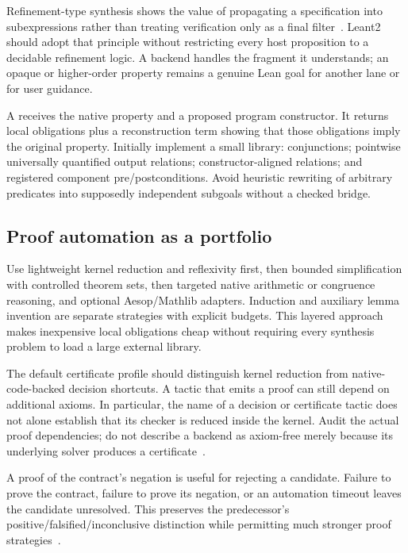 Refinement-type synthesis shows the value of propagating a specification into subexpressions rather than treating verification only as a final filter~\cite{synquid}. Leant2 should adopt that principle without restricting every host proposition to a decidable refinement logic. A backend handles the fragment it understands; an opaque or higher-order property remains a genuine Lean goal for another lane or for user guidance.

A  receives the native property and a proposed program constructor. It returns local obligations plus a reconstruction term showing that those obligations imply the original property. Initially implement a small library: conjunctions; pointwise universally quantified output relations; constructor-aligned relations; and registered component pre/postconditions. Avoid heuristic rewriting of arbitrary predicates into supposedly independent subgoals without a checked bridge.

\subsection{Proof automation as a portfolio}

Use lightweight kernel reduction and reflexivity first, then bounded simplification with controlled theorem sets, then targeted native arithmetic or congruence reasoning, and optional Aesop/Mathlib adapters. Induction and auxiliary lemma invention are separate strategies with explicit budgets. This layered approach makes inexpensive local obligations cheap without requiring every synthesis problem to load a large external library.

The default certificate profile should distinguish kernel reduction from native-code-backed decision shortcuts. A tactic that emits a proof can still depend on additional axioms. In particular, the name of a decision or certificate tactic does not alone establish that its checker is reduced inside the kernel. Audit the actual proof dependencies; do not describe a backend as axiom-free merely because its underlying solver produces a certificate~\cite{lean-axioms,lean-tactics}.

A proof of the contract's negation is useful for rejecting a candidate. Failure to prove the contract, failure to prove its negation, or an automation timeout leaves the candidate unresolved. This preserves the predecessor's positive/falsified/inconclusive distinction while permitting much stronger proof strategies~\cite{behavior}.

